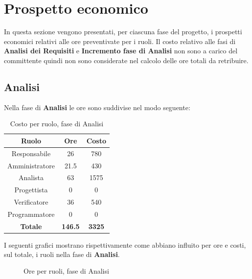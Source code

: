 \section{Prospetto economico}
In questa sezione vengono presentati, per ciascuna fase del progetto, i prospetti economici relativi alle ore preventivate per i ruoli. Il costo relativo alle fasi di \textbf{Analisi dei Requisiti} e \textbf{Incremento fase di Analisi} non sono a carico del committente quindi non sono considerate nel calcolo delle ore totali da retribuire.

\subsection{Analisi}
Nella fase di \textbf{Analisi} le ore sono suddivise nel modo seguente:
\begin{table}[H]
  \centering
  \begin{tabular}{|c|c|c|}
  \hline
  \textbf{Ruolo} &
  \textbf{Ore} &
  \textbf{Costo} \\
  \hline
  Responsabile & 26 & 780\\
  \hline
  Amministratore & 21.5 & 430\\
  \hline
  Analista & 63 & 1575\\
  \hline
  Progettista & 0 & 0 \\
  \hline
  Verificatore & 36 & 540\\
  \hline
  Programmatore & 0 & 0 \\
  \hline
   \textbf{Totale} & \textbf{146.5} & \textbf{3325} \\
    \hline
  \end{tabular}
  \caption{Costo per ruolo, fase di Analisi}
\end{table}

I seguenti grafici mostrano rispettivamente come abbiano influito per ore e costi, sul totale, i ruoli nella fase di \textbf{Analisi}.
\begin{figure}[H]
\centering
{}
\caption{Ore per ruoli, fase di Analisi}
\end{figure}


